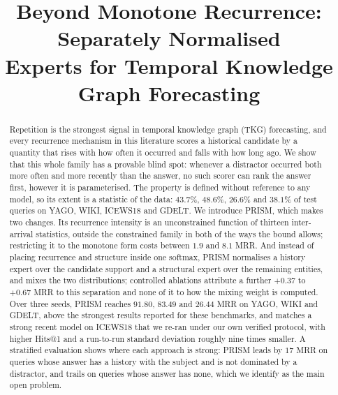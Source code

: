 \documentclass[conference]{IEEEtran}
\begin{document}
\title{Beyond Monotone Recurrence: Separately Normalised\\
Experts for Temporal Knowledge Graph Forecasting}

\author{
}

\maketitle

\begin{abstract}
Repetition is the strongest signal in temporal knowledge graph (TKG)
forecasting, and every recurrence mechanism in this literature scores a
historical candidate by a quantity that rises with how often it occurred and
falls with how long ago. We show that this whole family has a provable blind
spot: whenever a distractor occurred both more often and more recently than the
answer, no such scorer can rank the answer first, however it is
parameterised. The property is defined without reference to any model, so its
extent is a statistic of the data: $43.7\%$, $48.6\%$, $26.6\%$ and $38.1\%$ of
test queries on YAGO, WIKI, ICEWS18 and GDELT. We introduce PRISM, which makes
two changes. Its recurrence intensity is an unconstrained function of thirteen
inter-arrival statistics, outside the constrained family in both of the ways
the bound allows; restricting it to the monotone form costs between $1.9$ and
$8.1$ MRR. And instead of placing recurrence and structure inside one softmax,
PRISM normalises a history expert over the candidate support and a structural
expert over the remaining entities, and mixes the two distributions; controlled
ablations attribute a further $+0.37$ to $+0.67$ MRR to this separation and
none of it to how the mixing weight is computed. Over three seeds, PRISM
reaches $91.80$, $83.49$ and $26.44$ MRR on YAGO, WIKI and GDELT, above the
strongest results reported for these benchmarks, and matches a strong recent
model on ICEWS18 that we re-ran under our own verified protocol, with higher
Hits@1 and a run-to-run standard deviation roughly nine times smaller. A stratified evaluation
shows where each approach is strong: PRISM leads by $17$ MRR on queries whose
answer has a history with the subject and is not dominated by a distractor,
and trails on queries whose answer has none, which we identify as the main open problem.
\end{abstract}
\end{document}
